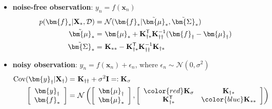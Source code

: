 \begin{itemize}
    \item \textbf{noise-free observation}: $y_n=f(\bm{x}_n)$
    \begin{align}
        p({\bm{f}}_*|\mathbf{X}_*,\mathcal{D}) 
        =&~ \mathcal{N}({\bm{f}}_*|\Tilde{\bm{\mu}}_*,\Tilde{\bm{\Sigma}}_*) \\
        \Tilde{\bm{\mu}}_*
        =&~ \bm{\mu}_* + \mathbf{K}_{\dagger*}^\mathsf{T}\mathbf{K}_{\dagger\dagger}^{-1}(\bm{f}_\dagger-\bm{\mu}_\dagger) \\
        \Tilde{\bm{\Sigma}}_*
        =&~ \mathbf{K}_{**} - \mathbf{K}_{\dagger*}^\mathsf{T}\mathbf{K}_{\dagger\dagger}^{-1}\mathbf{K}_{\dagger*}
    \end{align}
    \item \textbf{noisy observation}: $y_n=f(\bm{x}_n) + \epsilon_n$, where $\epsilon_n\sim\mathcal{N}(0,\sigma^2)$
    \begin{align}
        \mathrm{Cov}(\bm{y}_\dagger|\mathbf{X}_\dagger)
        =&~ \mathbf{K}_{\dagger\dagger}+\sigma^2\mathbf{I}=:\mathbf{K}_\sigma \\
        \left[\begin{array}{c}
            \bm{y}_\dagger \\
            \bm{f}_*
        \end{array}\right]
        =&~\mathcal{N}\left(\left[\begin{array}{c}
            \bm{\mu}_\dagger \\
            \bm{\mu}_*
        \end{array}\right],\left[\begin{array}{cc}
            {\color{red}\mathbf{K}_\sigma} & \mathbf{K}_{\dagger*} \\
            \mathbf{K}_{\dagger*}^\mathsf{T} & {\color{blue}\mathbf{K}_{**}}\label{eq:gpnoisy}
        \end{array}\right]\right)
    \end{align}
\end{itemize}

